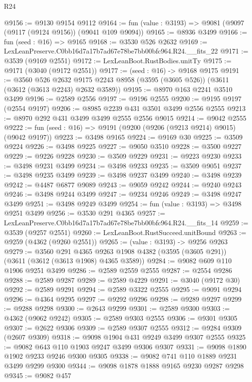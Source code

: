 \begin{lexlean}{R24}
\begin{coremodule}
@9156 := @9130 @9154 @9112
@9164 := fun (value : @3193) => @9081 (@9097 (@9117 (@9124 @9156)) (@9041 @109 @9094))
@9165 := @8936 @3499
@9166 := fun (seed : @16) => @9165
@9168 := @3530 @526 @2632
@9169 := LexLeanPreserve.C0bb16d7a17b7ad67e78be7bb00bfc964.R24.__fits_22
@9171 := @3539 (@9169 @2551)
@9172 := LexLeanBoot.RustBodies.unitTy
@9175 := @9171 (@3040 (@9172 @2551))
@9177 := (seed : @16) -> @9168 @9175
@9191 := @3560
    @526
    @2632
    @9175
    @2243
    @8958
    (@3595 (@3605 @526))
    (@3611 (@3612 (@3613 @2243) @2632 @3589))
@9195 := @8970 @163 @2241 @3510 @3499
@9196 := @2589 @2556
@9197 := @9196 @2555
@9200 := @9195 @9197 (@2554 @9197)
@9206 := @8985 @2239 @431 @3501 @3499 @2556 @2555
@9213 := @8970 @292 @431 @3499 @3499 @2555 @2556 @9015
@9214 := @9042 @2555
@9222 := fun (seed : @16) => @9191 (@9200 (@9206 (@9213 @9214) @9015) (@9042 @9197))
@9223 := @3498 @9165
@9224 := @9169 @30
@9225 := @3509 @9224
@9226 := @3498 @9225
@9227 := @9050 @3510
@9228 := @3500 @9227
@9229 := @9226 @9228
@9230 := @3509 @9229
@9231 := @9223 @9230
@9233 := @3498 @9231 @3499
@9234 := @3498 @9233
@9235 := @3509 @9051
@9237 := @3498 @9235 @3499
@9239 := @3498 @9237 @3499
@9240 := @3498 @9239
@9242 := @4487 @6877 @9089
@9243 := @9059 @9242
@9244 := @9240 @9243
@9246 := @3498 @9244 @3499
@9247 := @9234 @9246
@9249 := @3498 @9247 @3499
@9251 := @3498 @9249 @3499
@9254 := fun (value : @3193) => @3498 @9251 @3499
@9256 := @3530 @291 @4365
@9257 := LexLeanPreserve.C0bb16d7a17b7ad67e78be7bb00bfc964.R24.__fits_14
@9259 := @3539 (@9257 @2551)
@9260 := LexLeanBoot.RustSucceed.unitBound
@9263 := @9259 (@4362 (@9260 @2551))
@9265 := (value : @3193) -> @9256 @9263
@9279 := @3560
    @291
    @4365
    @9263
    @1908
    @4382
    (@3595 (@3605 @291))
    (@3611 (@3612 (@3613 @1908) @4365 @3589))
@9284 := @9082 @609 @110 @1906 @9251 @3499
@9286 := @2589 @2559 @2555
@9287 := @2554 @9286
@9288 := @2589 @9287
@9289 := @2589 @4229
@9291 := @3040 (@9172 @30)
@9292 := @2589 @9291
@9294 := @2589 @3322 @2555
@9295 := @9091 @9294
@9296 := @4364 @9295
@9297 := @9292 @9296
@9298 := @9289 @9297
@9299 := @9288 @9298
@9300 := @2643 @9299
@9301 := @2589 @9300
@9303 := @4362 (@9062 @9242)
@9305 := @2589 @9303 @2555
@9306 := @9301 @9305
@9307 := @2622 @9306
@9309 := @2589 @9307 @2555
@9312 := @9284 @9309 (@2607 @9309)
@9318 := @9098 @1904 @431 @9249 @3499 @9307 @2555
@9325 := @9082 @643 @110 @1903 @9247 @3499 @9306 @9307
@9331 := @9098 @1890 @1902 @9233 @9246 @9300 @9305
@9338 := @9082 @741 @110 @1889 @9231 @3499 @9299 @9300
@9344 := @9098 @1878 @1888 @9165 @9230 @9287 @9298
@9345 := @9082 @457

\end{coremodule}
\end{lexlean}
